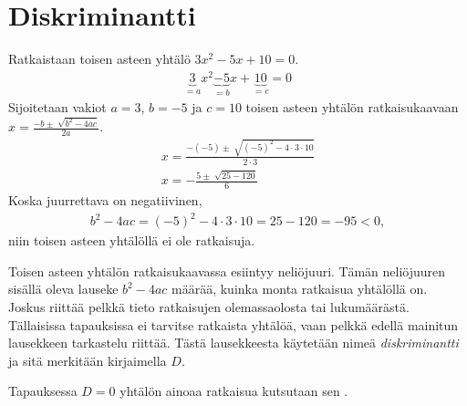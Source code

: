 \section{Diskriminantti}


\begin{esimerkki}
    Ratkaistaan toisen asteen yhtälö $3x^2-5x+10=0$.
    \begin{align*}
        \underbrace{3}_{=a}x^2\underbrace{-5}_{=b}x+\underbrace{10}_{=c}=0
    \end{align*}
    Sijoitetaan vakiot $a=3$, $b=-5$ ja $c=10$ toisen asteen yhtälön ratkaisukaavaan $x=\frac{-b \pm \sqrt[]{b^2-4ac}}{2a}$.
    \begin{align*}
        x=\frac{-(-5) \pm \sqrt[]{(-5)^2-4\cdot 3 \cdot 10}}{2 \cdot 3} \\
        x=-\frac{5 \pm \sqrt[]{25-120}}{6}
    \end{align*}
    Koska juurrettava on negatiivinen,
    \begin{align*}
        b^2-4ac=(-5)^2-4 \cdot 3 \cdot 10=25-120=-95<0,
    \end{align*}
    niin toisen asteen yhtälöllä ei ole ratkaisuja.
\end{esimerkki}


Toisen asteen yhtälön ratkaisukaavassa esiintyy neliöjuuri. Tämän neliöjuuren sisällä oleva lauseke $b^2-4ac$ määrää, kuinka monta ratkaisua yhtälöllä on. Joskus riittää pelkkä tieto ratkaisujen olemassaolosta tai lukumäärästä. Tällaisissa tapauksissa ei tarvitse ratkaista yhtälöä, vaan pelkkä edellä mainitun lausekkeen tarkastelu riittää. Tästä lausekkeesta käytetään nimeä \emph{diskriminantti} ja sitä merkitään kirjaimella $D$.

Tapauksessa $D=0$ yhtälön ainoaa ratkaisua kutsutaan
sen .

